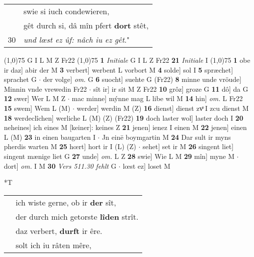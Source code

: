 \documentclass[8pt,a4paper,notitlepage]{article}
\begin{document}
\begin{table}[ht]
\begin{minipage}[t]{0.5\linewidth}
\begin{tabular}{rl}
 & swie si iuch condewieren,\\ 
 & gêt durch si, dâ mîn pfert \textbf{dort} stêt,\\ 
30 & \textit{und lœst ez ûf: nâch iu ez gêt}."\\ 
\end{tabular}
\scriptsize
\line(1,0){75} \newline
G I L M Z Fr22 \newline
\line(1,0){75} \newline
\textbf{1} \textit{Initiale} G I L Z Fr22  \textbf{21} \textit{Initiale} I  \newline
\line(1,0){75} \newline
\textbf{1} obe ir daz] abir der M \textbf{3} verbert] werbent L vorbort M \textbf{4} solde] sol I \textbf{5} spræchet] sprachet G  $\cdot$ der volge] \textit{om.} G \textbf{6} suocht] suehte G (Fr22) \textbf{8} minne unde vröude] Minnin vnde vrewedin Fr22  $\cdot$ sît ir] ir sit M Z Fr22 \textbf{10} grôz] groze G \textbf{11} dô] da G \textbf{12} swer] Wer L M Z  $\cdot$ mac minne] mýnne mag L libe wil M \textbf{14} hin] \textit{om.} L Fr22 \textbf{15} swem] Wem L (M)  $\cdot$ werder] werdin M (Z) \textbf{16} dienst] dienst zvͦ I zcu dienst M \textbf{18} werdeclîchen] werliche L (M) (Z) (Fr22) \textbf{19} doch laster wol] laster doch I \textbf{20} neheines] ich eines M [keiner]: keines Z \textbf{21} jenen] ienez I einen M \textbf{22} jenen] einen L (M) \textbf{23} in einen baugarten I  $\cdot$ Jn einē boymgartin M \textbf{24} Dar sult ir myns pherdis warten M \textbf{25} hœrt] hort ir I (L) (Z)  $\cdot$ sehet] set ir M \textbf{26} singent liet] singent mænige liet G \textbf{27} unde] \textit{om.} L Z \textbf{28} swie] Wie L M \textbf{29} mîn] myne M  $\cdot$ dort] \textit{om.} I M \textbf{30} \textit{Vers 511.30 fehlt} G   $\cdot$ lœst ez] loset M \newline
\end{minipage}
\hspace{0.5cm}
\begin{minipage}[t]{0.5\linewidth}
\small
\begin{center}*T
\end{center}
\begin{tabular}{rl}
 & ich wiste gerne, ob ir \textbf{der} sît,\\ 
 & der durch mich getorste \textbf{lîden} strît.\\ 
 & daz verbert, \textbf{durft} ir êre.\\ 
 & solt ich iu râten mêre,\\ 

\end{tabular}
\end{minipage}
\end{table}
\end{document}
